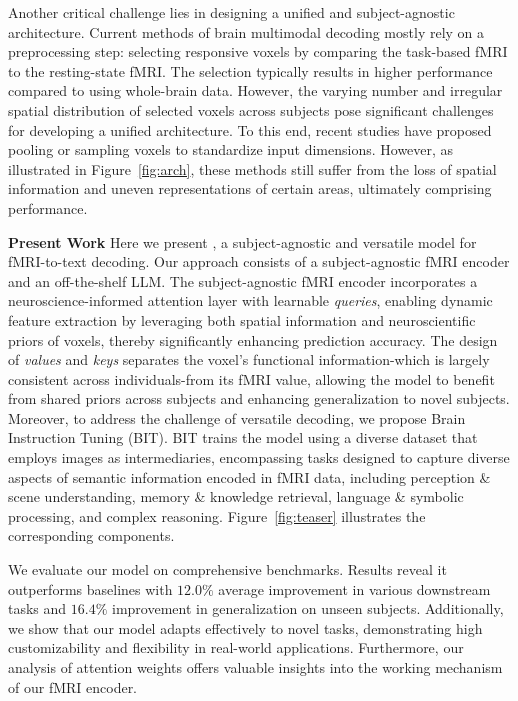 Another critical challenge lies in designing a unified and subject-agnostic architecture. Current methods of brain multimodal decoding mostly rely on a preprocessing step: selecting responsive voxels by comparing the task-based fMRI to the resting-state fMRI. The selection typically results in higher performance compared to using whole-brain data. However, the varying number and irregular spatial distribution of selected voxels across subjects pose significant challenges for developing a unified architecture. To this end, recent studies \cite{wang2024mindbridge,wang2024unibrain} have proposed pooling or sampling voxels to standardize input dimensions. However, as illustrated in Figure~\ref{fig:arch}, these methods still suffer from the loss of spatial information and uneven representations of certain areas, ultimately comprising performance.

\noindent\textbf{Present Work} Here we present \name{}, a subject-agnostic and versatile model for fMRI-to-text decoding. Our approach consists of a subject-agnostic fMRI encoder and an off-the-shelf LLM. The subject-agnostic fMRI encoder incorporates a neuroscience-informed attention layer with learnable \textit{queries}, enabling dynamic feature extraction by leveraging both spatial information and neuroscientific priors of voxels, thereby significantly enhancing prediction accuracy. The design of \textit{values} and \textit{keys} separates the voxel's functional information-which is largely consistent across individuals-from its fMRI value, allowing the model to benefit from shared priors across subjects and enhancing generalization to novel subjects. Moreover, to address the challenge of versatile decoding, we propose Brain Instruction Tuning (BIT). BIT trains the model using a diverse dataset that employs images as intermediaries, encompassing tasks designed to capture diverse aspects of semantic information encoded in fMRI data, including perception \& scene understanding, memory \& knowledge retrieval, language \& symbolic processing, and complex reasoning. Figure~\ref{fig:teaser} illustrates the corresponding components.

We evaluate our model on comprehensive benchmarks. Results reveal it outperforms baselines with $12.0\%$ average improvement in various downstream tasks and $16.4\%$ improvement in generalization on unseen subjects. Additionally, we show that our model adapts effectively to novel tasks, demonstrating high customizability and flexibility in real-world applications. Furthermore, our analysis of attention weights offers valuable insights into the working mechanism of our fMRI encoder.

